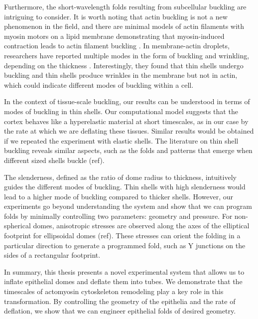 Furthermore, the short-wavelength folds resulting from subcellular buckling are intriguing to consider. It is worth noting that actin buckling is not a new phenomenon in the field, and there are minimal models of actin filaments with myosin motors on a lipid membrane demonstrating that myosin-induced contraction leads to actin filament buckling \cite{murrell2012, costa2002,  wang2019}. In membrane-actin droplets, researchers have reported multiple modes in the form of buckling and wrinkling, depending on the thickness \cite{kusters2019}. Interestingly, they found that thin shells undergo buckling and thin shells produce wrinkles in the membrane but not in actin, which could indicate different modes of buckling within a cell.

In the context of tissue-scale buckling, our results can be understood in terms of modes of buckling in thin shells. Our computational model suggests that the cortex behaves like a hyperelastic material at short timescales, as in our case by the rate at which we are deflating these tissues. Similar results would be obtained if we repeated the experiment with elastic shells. The literature on thin shell buckling reveals similar aspects, such as the folds and patterns that emerge when different sized shells buckle (ref).

The slenderness, defined as the ratio of dome radius to thickness, intuitively guides the different modes of buckling. Thin shells with high slenderness would lead to a higher mode of buckling compared to thicker shells. However, our experiments go beyond understanding the system and show that we can program folds by minimally controlling two parameters: geometry and pressure. For non-spherical domes, anisotropic stresses are observed along the axes of the elliptical footprint for ellipsoidal domes (ref). These stresses can orient the folding in a particular direction to generate a programmed fold, such as Y junctions on the sides of a rectangular footprint.

In summary, this thesis presents a novel experimental system that allows us to inflate epithelial domes and deflate them into tubes. We demonstrate that the timescales of actomyosin cytoskeleton remodeling play a key role in this transformation. By controlling the geometry of the epithelia and the rate of deflation, we show that we can engineer epithelial folds of desired geometry.